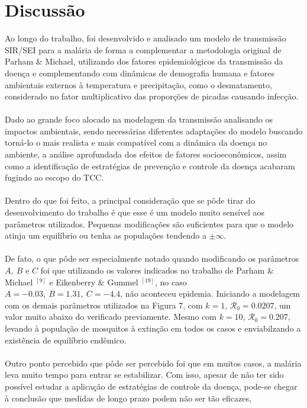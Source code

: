 \documentclass[12pt]{article}
\begin{document}
\newpage
\section{Discussão}

Ao longo do trabalho, foi desenvolvido e analisado um modelo de transmissão 
SIR/SEI para a malária de forma a complementar a metodologia original de Parham \& Michael, 
utilizando dos fatores epidemiológicos da transmissão da doença e complementando com 
dinâmicas de demografia humana e fatores ambientais externos à temperatura e precipitação,
como o desmatamento, considerado no fator multiplicativo das proporções de picadas
causando infecção. 
\\\\
Dado ao grande foco alocado na modelagem da transmissão analisando os impactos 
ambientais, sendo necessárias diferentes adaptações do modelo buscando torná-lo o 
mais realista e mais compatível com a dinâmica da doença no ambiente, a análise 
aprofundada dos efeitos de fatores socioeconômicos, assim como a identificação 
de estratégias de prevenção e controle da doença acabaram fugindo ao escopo do 
TCC.
\\\\
Dentro do que foi feito, a principal consideração que se pôde tirar do 
desenvolvimento do trabalho é que esse é um modelo muito sensível aos 
parâmetros utilizados. Pequenas modificações são suficientes para que o modelo 
atinja um equilíbrio ou tenha as populações tendendo a $\pm \infty$.
\\\\
De fato, o que pôde ser especialmente notado quando modificando os parâmetros 
$A, \ B$ e $C$ foi que utilizando os valores indicados
no trabalho de Parham $\&$ Michael $^{[9]}$ e Eikenberry $\&$ Gummel $^{[19]}$,
no caso $A = -0.03, \ B = 1.31, \ C = -4.4$, não aconteceu epidemia.
Iniciando a modelagem com os demais parâmetros utilizados 
na Figura 7, com $k=1$, $\mathcal{R}_0 = 0.0207$, um valor muito abaixo do verificado previamente.
Mesmo com $k=10$, $\mathcal{R}_0 = 0.207$, levando à população de mosquitos à extinção em todos os casos 
e enviabilzando a existência de equilíbrio endêmico.
\\\\
Outro ponto percebido que pôde ser percebido foi que em muitos casos, 
a malária leva muito tempo para entrar se estabilizar. Com isso,
apesar de não ter sido possível estudar a aplicação de estratégias de controle da doença,
pode-se chegar à conclusão que medidas de longo prazo podem não ser tão eficazes,
\end{document}
